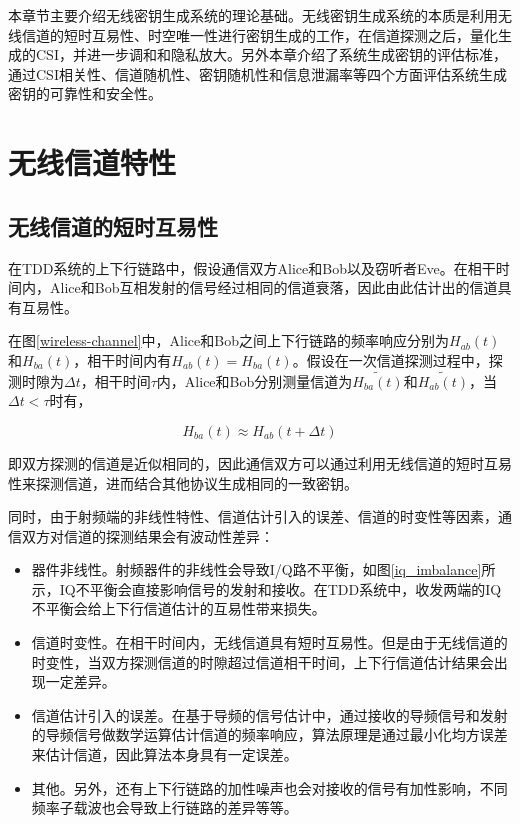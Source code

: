 \documentclass[master]{seuthesis} %
\begin{document}
\begin{Main}
本章节主要介绍无线密钥生成系统的理论基础。无线密钥生成系统的本质是利用无线信道的短时互易性、时空唯一性进行密钥生成的工作，在信道探测之后，量化生成的CSI，并进一步调和和隐私放大。另外本章介绍了系统生成密钥的评估标准，通过CSI相关性、信道随机性、密钥随机性和信息泄漏率等四个方面评估系统生成密钥的可靠性和安全性。

\section{无线信道特性}

\subsection{无线信道的短时互易性}

在TDD系统的上下行链路中，假设通信双方Alice和Bob以及窃听者Eve。在相干时间内，Alice和Bob互相发射的信号经过相同的信道衰落，因此由此估计出的信道具有互易性。

在图\ref{wireless-channel}中，Alice和Bob之间上下行链路的频率响应分别为$H_{ab}(t)$和$H_{ba}(t)$，相干时间内有$H_{ab}(t) = H_{ba}(t)$。假设在一次信道探测过程中，探测时隙为$\Delta t$，相干时间$\tau$内，Alice和Bob分别测量信道为$\tilde{H_{ba}(t)}$和$\tilde{H_{ab}(t)}$，当$ \Delta t < \tau $时有，

\begin{equation}
    H_{ba}(t) \approx H_{ab}(t + \Delta t)
\end{equation}

即双方探测的信道是近似相同的，因此通信双方可以通过利用无线信道的短时互易性来探测信道，进而结合其他协议生成相同的一致密钥。

同时，由于射频端的非线性特性、信道估计引入的误差、信道的时变性等因素\cite{guillaud2005practical}，通信双方对信道的探测结果会有波动性差异：

\begin{itemize}
    \item 器件非线性。射频器件的非线性会导致I/Q路不平衡，如图\ref{iq_imbalance}所示，IQ不平衡会直接影响信号的发射和接收。在TDD系统中，收发两端的IQ不平衡会给上下行信道估计的互易性带来损失。
    \item 信道时变性。在相干时间内，无线信道具有短时互易性。但是由于无线信道的时变性，当双方探测信道的时隙超过信道相干时间，上下行信道估计结果会出现一定差异。
    \item 信道估计引入的误差。在基于导频的信号估计中，通过接收的导频信号和发射的导频信号做数学运算估计信道的频率响应，算法原理是通过最小化均方误差来估计信道，因此算法本身具有一定误差。
    \item 其他。另外，还有上下行链路的加性噪声也会对接收的信号有加性影响，不同频率子载波也会导致上行链路的差异等等。
\end{itemize}


\end{Main}
\end{document}
